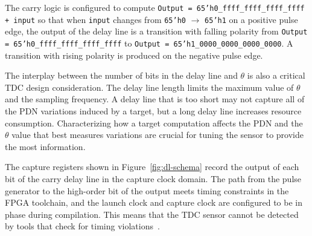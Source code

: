 The carry logic is configured to compute
\texttt{Output = 65'h0\_ffff\_ffff\_ffff\_ffff + input} so that when \texttt{input} changes from \texttt{65'h0} $\rightarrow$ \texttt{65'h1} on a positive pulse edge, the output of the delay line is a transition with falling polarity from \texttt{Output = 65'h0\_ffff\_ffff\_ffff\_ffff} to \texttt{Output = 65'h1\_0000\_0000\_0000\_0000}.
A transition with rising polarity is produced on the negative pulse edge.



The interplay between the number of bits in the delay line and $\theta$ is also a critical TDC design consideration.
The delay line length limits the maximum value of $\theta$ and the sampling frequency.
A delay line that is too short may not capture all of the PDN variations induced by a target, but a long delay line increases resource consumption.
Characterizing how a target computation affects the PDN and the $\theta$ value that best measures variations are crucial for tuning the sensor to provide the most information.



The capture registers shown in Figure~\ref{fig:dl-schema} record the output of each bit of the carry delay line in the capture clock domain.
The path from the pulse generator to the high-order bit of the output meets timing constraints in the FPGA toolchain, and the launch clock and capture clock are configured to be in phase during compilation.
This means that the TDC sensor cannot be detected by tools that check for timing violations~\cite{krautter2019mitigating}.



